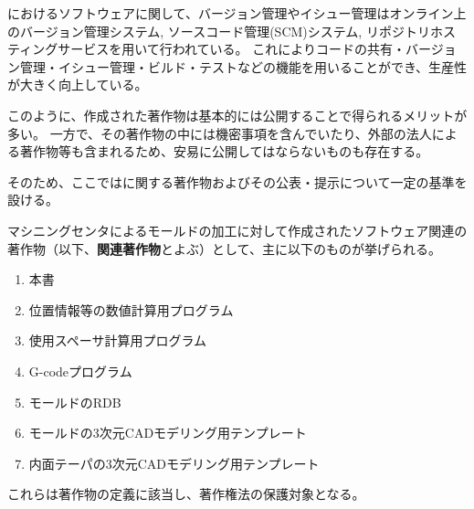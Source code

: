 

\DMname におけるソフトウェアに関して、バージョン管理やイシュー管理はオンライン上のバージョン管理システム, ソースコード管理(SCM)システム, リポジトリホスティングサービスを用いて行われている。
これによりコードの共有・バージョン管理・イシュー管理・ビルド・テストなどの機能を用いることができ、生産性が大きく向上している。

このように、作成された著作物は基本的には公開することで得られるメリットが多い。
一方で、その著作物の中には機密事項を含んでいたり、外部の法人による著作物等も含まれるため、安易に公開してはならないものも存在する。

そのため、ここでは\DMname に関する著作物およびその公表・提示について一定の基準を設ける。


マシニングセンタによるモールドの加工に対して作成されたソフトウェア関連の著作物（以下、\textbf{関連著作物}とよぶ）として、主に以下のものが挙げられる。
\begin{enumerate}
\item 本書
\item 位置情報等の数値計算用プログラム
\item 使用スペーサ計算用プログラム
\item G-codeプログラム
\item モールドのRDB
\item モールドの3次元CADモデリング用テンプレート
\item 内面テーパの3次元CADモデリング用テンプレート
\end{enumerate}
これらは著作物の定義に該当し、著作権法の保護対象となる。





